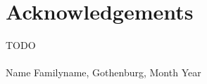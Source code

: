 \thispagestyle{plain}			%
\section*{Acknowledgements}
TODO\\
\\

\vspace{1.5cm}
\hfill
Name Familyname, Gothenburg, Month Year

\newpage				%
\thispagestyle{empty}
\mbox{}